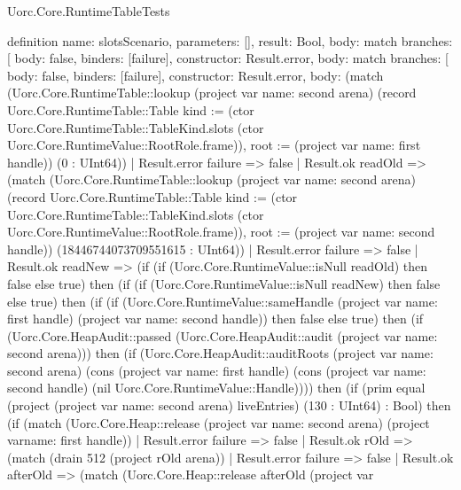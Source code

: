 \begin{lexlean}{Uorc.Core.RuntimeTableTests}
\begin{semanticmodule}
definition{
  name: slotsScenario,
  parameters: [],
  result: Bool,
  body: match{
    branches: [
      {body: false, binders: [failure], constructor: Result.error},
      {
        body: match{
          branches: [
            {body: false, binders: [failure], constructor: Result.error},
            {
              body: (match (Uorc.Core.RuntimeTable::lookup (project var{
                  name: second
                } arena) (record Uorc.Core.RuntimeTable::Table {kind := (ctor Uorc.Core.RuntimeTable::TableKind.slots (ctor Uorc.Core.RuntimeValue::RootRole.frame)), root := (project var{
                  name: first
                } handle)}) (0 : UInt64))
                | Result.error failure => false
                | Result.ok readOld => (match (Uorc.Core.RuntimeTable::lookup (project var{
                    name: second
                  } arena) (record Uorc.Core.RuntimeTable::Table {kind := (ctor Uorc.Core.RuntimeTable::TableKind.slots (ctor Uorc.Core.RuntimeValue::RootRole.frame)), root := (project var{
                    name: second
                  } handle)}) (18446744073709551615 : UInt64))
                  | Result.error failure => false
                  | Result.ok readNew => (if (if (Uorc.Core.RuntimeValue::isNull readOld) then false else true) then (if (if (Uorc.Core.RuntimeValue::isNull readNew) then false else true) then (if (if (Uorc.Core.RuntimeValue::sameHandle (project var{
                    name: first
                  } handle) (project var{
                    name: second
                  } handle)) then false else true) then (if (Uorc.Core.HeapAudit::passed (Uorc.Core.HeapAudit::audit (project var{
                    name: second
                  } arena))) then (if (Uorc.Core.HeapAudit::auditRoots (project var{
                    name: second
                  } arena) (cons (project var{
                    name: first
                  } handle) (cons (project var{
                    name: second
                  } handle) (nil Uorc.Core.RuntimeValue::Handle)))) then (if (prim equal (project (project var{
                    name: second
                  } arena) liveEntries) (130 : UInt64) : Bool) then (if (match (Uorc.Core.Heap::release (project var{
                      name: second
                    } arena) (project var{name: first} handle))
                    | Result.error failure => false
                    | Result.ok rOld => (match (drain 512 (project rOld arena))
                      | Result.error failure => false
                      | Result.ok afterOld => (match (Uorc.Core.Heap::release afterOld (project var{
}}}}}}
\end{semanticmodule}
\end{lexlean}

